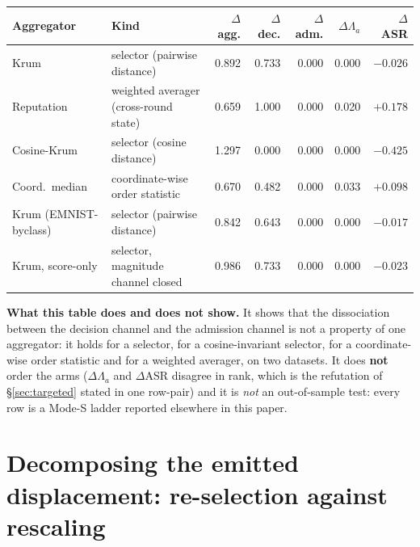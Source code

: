 \documentclass{article}
\begin{document}
\begin{center}\small\setlength{\tabcolsep}{3pt}
\begin{tabular}{llrrrrr}
\toprule
Aggregator & Kind & $\Delta$ agg. & $\Delta$ dec. & $\Delta$ adm. & $\Delta \Lambda_a$ & $\Delta$ ASR \\
\midrule
Krum & selector (pairwise distance) & 0.892 & 0.733 & 0.000 & 0.000 & $-0.026$ \\
Reputation & weighted averager (cross-round state) & 0.659 & 1.000 & 0.000 & 0.020 & $+0.178$ \\
Cosine-Krum & selector (cosine distance) & 1.297 & 0.000 & 0.000 & 0.000 & $-0.425$ \\
Coord.\ median & coordinate-wise order statistic & 0.670 & 0.482 & 0.000 & 0.033 & $+0.098$ \\
Krum (EMNIST-byclass) & selector (pairwise distance) & 0.842 & 0.643 & 0.000 & 0.000 & $-0.017$ \\
Krum, score-only & selector, magnitude channel closed & 0.986 & 0.733 & 0.000 & 0.000 & $-0.023$ \\
\bottomrule
\end{tabular}
\end{center}

\noindent \textbf{What this table does and does not show.} It shows that the dissociation between the decision channel and the admission channel is not a property of one aggregator: it holds for a selector, for a cosine-invariant selector, for a coordinate-wise order statistic and for a weighted averager, on two datasets. It does \textbf{not} order the arms ($\Delta\Lambda_a$ and $\Delta$ASR disagree in rank, which is the refutation of \S\ref{sec:targeted} stated in one row-pair) and it is \emph{not} an out-of-sample test: every row is a Mode-S ladder reported elsewhere in this paper.

\section{Decomposing the emitted displacement: re-selection against rescaling}
\label{app:decomposition}
\end{document}
